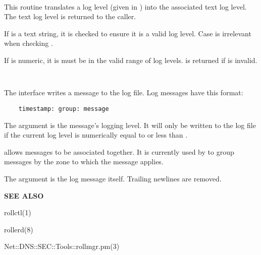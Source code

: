\begin{description}
\item {}\verb" "

This routine translates a log level (given in ) into the
associated text log level.  The text log level is returned to the caller.

If  is a text string, it is checked to ensure it is a valid log
level.  Case is irrelevant when checking .

If  is numeric, it is must be in the valid range of log levels.
 is returned if  is invalid.

\item {}\verb" "

The  interface writes a message to the log file.  Log
messages have this format:

\begin{verbatim}
    timestamp: group: message
\end{verbatim}

The  argument is the message's logging level.  It will only be
written to the log file if the current log level is numerically equal to or
less than .

 allows messages to be associated together.  It is currently used
by  to group messages by the zone to which the message applies.

The  argument is the log message itself.  Trailing newlines are
removed.

\end{description}

{\bf SEE ALSO}

rollctl(1)

rollerd(8)

Net::DNS::SEC::Tools::rollmgr.pm(3)

